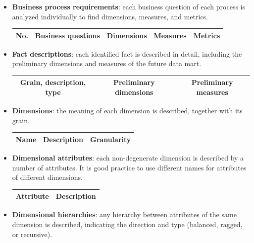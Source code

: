 \begin{itemize}
    \item \textbf{Business process requirements}: each business question of each process is analyzed individually to find dimensions, measures, and metrics.
    \begin{table}[H]
    \centering
    \begin{tabular}{|c|c|c|c|c|}
        \hline
        No. & Business questions & Dimensions & Measures & Metrics \\
        \hline
    \end{tabular}
    \end{table}
    \item \textbf{Fact descriptions}: each identified fact is described in detail, including the preliminary dimensions and measures of the future data mart.
    \begin{table}[H]
    \centering
    \begin{tabular}{|c|c|c|}
        \hline
        Grain, description, type & Preliminary dimensions & Preliminary measures \\
        \hline
    \end{tabular}
    \end{table}
    \item \textbf{Dimensions}: the meaning of each dimension is described, together with its grain.
    \begin{table}[H]
    \centering
    \begin{tabular}{|c|c|c|}
        \hline
        Name & Description & Granularity \\
        \hline
    \end{tabular}
    \end{table}
    \item \textbf{Dimensional attributes}: each non-degenerate dimension is described by a number of attributes. It is good practice to use different names for attributes of different dimensions.
    \begin{table}[H]
    \centering
    \begin{tabular}{|c|c|}
        \hline
        Attribute & Description \\
        \hline
    \end{tabular}
    \end{table}
    \item \textbf{Dimensional hierarchies}: any hierarchy between attributes of the same dimension is described, indicating the direction and type (balanced, ragged, or recursive).
    \begin{table}[H]

\end{table}
\end{itemize}
